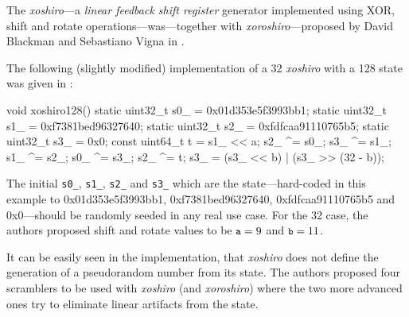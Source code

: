     The \emph{xoshiro}---a \emph{linear feedback shift register} generator implemented using XOR, shift and rotate operations---was---together with \emph{xoroshiro}---proposed by David Blackman and Sebastiano Vigna in \cite{Blackman:2018}.

    The following (slightly modified) implementation of a \SI{32}{\bit} \emph{xoshiro} with a \SI{128}{\bit} state was given in \cite{Blackman:2018}:
\begin{@empty}
    \lstset{
        language = [ISO]C++
    }
\begin{centeredshadowboxlisting}
void xoshiro128() {
    static uint32_t s0_ = 0x01d353e5f3993bb1;
    static uint32_t s1_ = 0xf7381bed96327640;
    static uint32_t s2_ = 0xfdfcaa91110765b5;
    static uint32_t s3_ = 0x0;
    const uint64_t t = s1_ << a;
    s2_ ^= s0_;
    s3_ ^= s1_;
    s1_ ^= s2_;
    s0_ ^= s3_;
    s2_ ^= t;
    s3_ = (s3_ << b) | (s3_ >> (32 - b));
}
\end{centeredshadowboxlisting}
\end{@empty}
    \textcolor{black!75}{The initial \lstinline|s0_|, \lstinline|s1_|, \lstinline|s2_| and \lstinline|s3_| which are the state---hard-coded in this example to 0x01d353e5f3993bb1, 0xf7381bed96327640, 0xfdfcaa91110765b5 and 0x0---should be randomly seeded in any real use case.} For the \SI{32}{\bit} case, the authors proposed shift and rotate values to be $\texttt{\small a} = 9$ and $\texttt{\small b} = 11$.

    It can be easily seen in the implementation, that \emph{xoshiro} does not define the generation of a pseudorandom number from its state. The authors proposed four scramblers to be used with \emph{xoshiro} (and \emph{xoroshiro}) where the two more advanced ones try to eliminate linear artifacts from the state.
    
